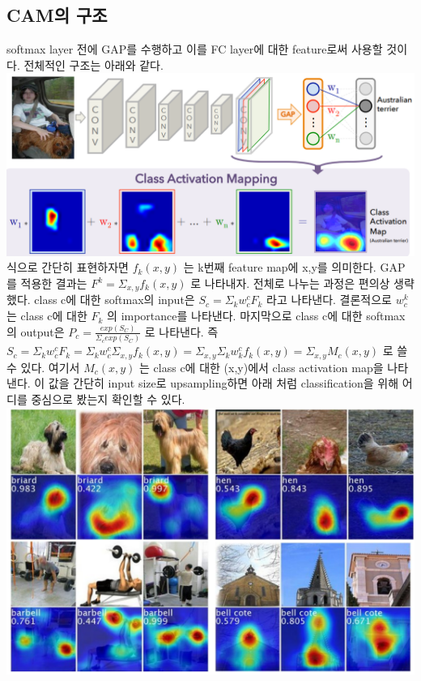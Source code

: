 \documentclass[extendedabs]{bmvc2k}
\begin{document}
\subsection{CAM의 구조}
 \quad softmax layer 전에 GAP를 수행하고 이를 FC layer에 대한 feature로써 사용할 것이다. 전체적인 구조는 아래와 같다. 
 \newline  \includegraphics[width=\linewidth]{images/00_CAM.PNG}
 식으로 간단히 표현하자면 $f_k(x,y)$ 는 k번째 feature map에 x,y를 의미한다. GAP를 적용한 결과는 $F^k= \Sigma_{x,y}f_k(x,y)$ 로 나타내자. 전체로 나누는 과정은 편의상 생략했다.
 class c에 대한 softmax의 input은 $S_c=\Sigma_k w_c^cF_k$ 라고 나타낸다. 결론적으로 $w_c^k$ 는 class c에 대한 $F_k$ 의 importance를 나타낸다.
 마지막으로 class c에 대한 softmax의 output은 $P_c=\frac{exp(S_C)}{\Sigma_c exp(S_C)}$ 로 나타낸다.
 즉 $S_c=\Sigma_k w_c^cF_k = \Sigma_k w_c^c \Sigma_{x,y}f_k(x,y) = \Sigma_{x,y} \Sigma_k w_k^c f_k(x,y) = \Sigma_{x,y}M_c(x,y)$ 로 쓸 수 있다.
 여기서 $M_c(x,y)$ 는 class c에 대한 (x,y)에서 class activation map을 나타낸다. 이 값을 간단히 input size로 upsampling하면 아래 처럼 classification을 위해 어디를 중심으로 봤는지 확인할 수 있다.
 \newline  \includegraphics[width=\linewidth]{images/01_CAM.PNG}
\end{document}
